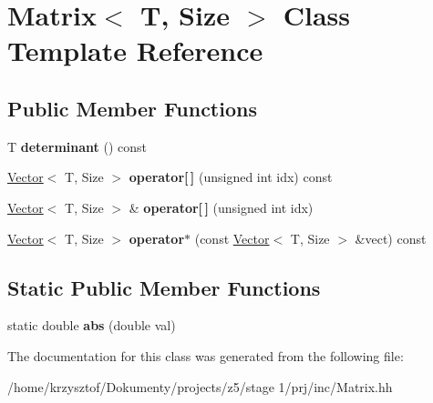 \hypertarget{class_matrix}{}\section{Matrix$<$ T, Size $>$ Class Template Reference}
\label{class_matrix}
\subsection*{Public Member Functions}
\begin{DoxyCompactItemize}
\item 
\mbox{\label{class_matrix_a8c91f08b670addb15138a05538d14eb1}} 
T {\bfseries determinant} () const
\item 
\mbox{\label{class_matrix_a4c0adec104675f24ec8bbc8a408b7808}} 
\hyperlink{class_vector}{Vector}$<$ T, Size $>$ {\bfseries operator\mbox{[}$\,$\mbox{]}} (unsigned int idx) const
\item 
\mbox{\label{class_matrix_a9aaf48b01e6fbcdf52e1ab32eb752031}} 
\hyperlink{class_vector}{Vector}$<$ T, Size $>$ \& {\bfseries operator\mbox{[}$\,$\mbox{]}} (unsigned int idx)
\item 
\mbox{\label{class_matrix_a47c97ac64a66414aa0538e82ca1263d1}} 
\hyperlink{class_vector}{Vector}$<$ T, Size $>$ {\bfseries operator$\ast$} (const \hyperlink{class_vector}{Vector}$<$ T, Size $>$ \&vect) const
\end{DoxyCompactItemize}
\subsection*{Static Public Member Functions}
\begin{DoxyCompactItemize}
\item 
\mbox{\label{class_matrix_ad0a665d1ba72b1f308449ff992531c29}} 
static double {\bfseries abs} (double val)
\end{DoxyCompactItemize}


The documentation for this class was generated from the following file\+:\begin{DoxyCompactItemize}
\item 
/home/krzysztof/\+Dokumenty/projects/z5/stage 1/prj/inc/Matrix.\+hh\end{DoxyCompactItemize}
